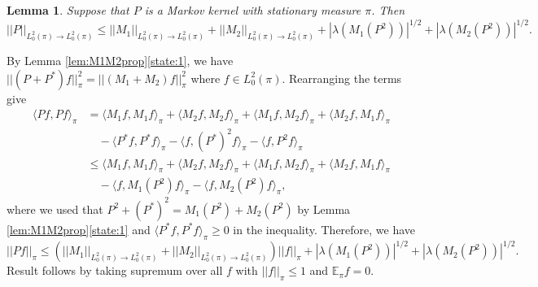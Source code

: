 \documentclass[12pt,a4]{amsart}
\numberwithin{equation}{section}
\theoremstyle{plain}
\newtheorem{lemma}{Lemma}[section]
\theoremstyle{definition}
\theoremstyle{remark}
\let\oldendproof\endproof
\renewenvironment{proof}[1][\proofname]{%
  \oldproof[\noindent\textbf{#1.} ]%
}{\oldendproof}
\newcommand{\1}{\mathds{1}}
\newcommand{\E}{\mathbb{E}}
\renewcommand{\leq}{\leqslant}
\renewcommand{\geq}{\geqslant}
\begin{document}
\begin{lemma}\label{lem:Popnbd}
	Suppose that $P$ is a Markov kernel with stationary measure $\pi$. Then
	$$||P||_{L^2_0(\pi) \to L^2_0(\pi)} \leq ||M_1||_{L^2_0(\pi) \to L^2_0(\pi)} + ||M_2||_{L^2_0(\pi) \to L^2_0(\pi)} + |\lambda(M_1(P^2))|^{1/2} + |\lambda(M_2(P^2))|^{1/2} .$$
\end{lemma}

\begin{proof}
	By Lemma \ref{lem:M1M2prop}\ref{state:1}, we have $||(P+P^*)f||_{\pi}^2 = ||(M_1+M_2)f||_{\pi}^2$ where $f \in L^2_0(\pi)$. Rearranging the terms give
	\begin{align*}
		\langle Pf,Pf \rangle_{\pi} &= \langle M_1f,M_1f \rangle_{\pi} + \langle M_2f,M_2f \rangle_{\pi} + \langle M_1f,M_2f \rangle_{\pi} + \langle M_2f,M_1f \rangle_{\pi} \\
		&\quad - \langle P^*f,P^*f \rangle_{\pi} - \langle f,(P^*)^2f \rangle_{\pi} - \langle f,P^2f \rangle_{\pi} \\
		&\leq \langle M_1f,M_1f \rangle_{\pi} + \langle M_2f,M_2f \rangle_{\pi} + \langle M_1f,M_2f \rangle_{\pi} + \langle M_2f,M_1f \rangle_{\pi} \\
		&\quad - \langle f,M_1(P^2)f \rangle_{\pi} - \langle f,M_2(P^2)f \rangle_{\pi} ,
	\end{align*}
	where we used that $P^2 + (P^*)^2 = M_1(P^2) + M_2(P^2)$ by Lemma \ref{lem:M1M2prop}\ref{state:1} and $\langle P^*f,P^*f \rangle_{\pi} \geq 0$ in the inequality. Therefore, we have
	$$||Pf||_{\pi} \leq  (||M_1||_{L^2_0(\pi) \to L^2_0(\pi)} + ||M_2||_{L^2_0(\pi) \to L^2_0(\pi)}) ||f||_{\pi} + |\lambda(M_1(P^2))|^{1/2} + |\lambda(M_2(P^2))|^{1/2} .$$
	Result follows by taking supremum over all $f$ with $||f||_{\pi} \leq 1$ and $\E_{\pi} f = 0$.	
\end{proof}
\end{document}
